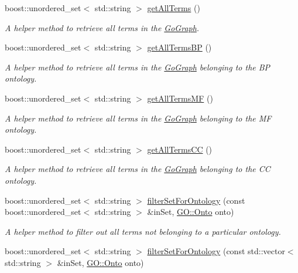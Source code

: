 \begin{DoxyCompactItemize}
boost\+::unordered\+\_\+set$<$ std\+::string $>$ \hyperlink{classGoGraph_ab497e840a1a63b5d25d6a104695a54fb}{get\+All\+Terms} ()
\begin{DoxyCompactList}\small\item\em A helper method to retrieve all terms in the \hyperlink{classGoGraph}{Go\+Graph}. \end{DoxyCompactList}\item 
boost\+::unordered\+\_\+set$<$ std\+::string $>$ \hyperlink{classGoGraph_ad4f45995d5cd7ebe4f0c20d8923db268}{get\+All\+Terms\+BP} ()
\begin{DoxyCompactList}\small\item\em A helper method to retrieve all terms in the \hyperlink{classGoGraph}{Go\+Graph} belonging to the BP ontology. \end{DoxyCompactList}\item 
boost\+::unordered\+\_\+set$<$ std\+::string $>$ \hyperlink{classGoGraph_a9e5592682e5e78c5d45364bf714fd0cf}{get\+All\+Terms\+MF} ()
\begin{DoxyCompactList}\small\item\em A helper method to retrieve all terms in the \hyperlink{classGoGraph}{Go\+Graph} belonging to the MF ontology. \end{DoxyCompactList}\item 
boost\+::unordered\+\_\+set$<$ std\+::string $>$ \hyperlink{classGoGraph_a47246d323ea642a2ffe169fa6da40bcf}{get\+All\+Terms\+CC} ()
\begin{DoxyCompactList}\small\item\em A helper method to retrieve all terms in the \hyperlink{classGoGraph}{Go\+Graph} belonging to the CC ontology. \end{DoxyCompactList}\item 
boost\+::unordered\+\_\+set$<$ std\+::string $>$ \hyperlink{classGoGraph_a1df055e607d7dc4650efedf56b149289}{filter\+Set\+For\+Ontology} (const boost\+::unordered\+\_\+set$<$ std\+::string $>$ \&in\+Set, \hyperlink{namespaceGO_a5ae335887b5cf40a9ef3045be9247fc3}{G\+O\+::\+Onto} onto)
\begin{DoxyCompactList}\small\item\em A helper method to filter out all terms not belonging to a particular ontology. \end{DoxyCompactList}\item 
boost\+::unordered\+\_\+set$<$ std\+::string $>$ \hyperlink{classGoGraph_a083e9fe34636a0e996efd0e9d0d65c3b}{filter\+Set\+For\+Ontology} (const std\+::vector$<$ std\+::string $>$ \&in\+Set, \hyperlink{namespaceGO_a5ae335887b5cf40a9ef3045be9247fc3}{G\+O\+::\+Onto} onto)

\end{DoxyCompactItemize}
